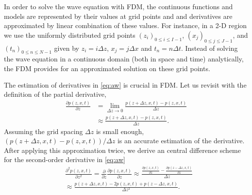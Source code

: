 \documentclass[11pt,titlepage]{article}
\theoremstyle{plain}
\theoremstyle{definition}
\theoremstyle{remark}
\numberwithin{equation}{section}
\begin{document}
In order to solve the wave equation with FDM, the continuous functions and models are represented by their values at grid points and and derivatives are approximated by linear combination of these values. For instance, in a 2-D region we use the uniformly distributed grid points $(z_i)_{0\le i \le I-1 }$, $(x_j)_{0\le j \le J-1}$, and $(t_n)_{0\le n \le N-1}$ given by $z_i = i\Delta z$, $x_j = j\Delta x$ and $t_n=n\Delta t$. Instead of solving the wave equation in a continuous domain (both in space and time) analytically, the FDM provides for an approximated solution on these grid points.  

The estimation of derivatives in \eqref{eq:aw} is crucial in FDM. Let us revisit with the definition of the partial derivative, 
 \begin{equation}
  \begin{aligned}
  \frac{\partial p(z, x, t)}{\partial z} &= \lim\limits_{\Delta z \rightarrow 0} \frac{p(z+\Delta z, x, t) - p(z, x, t)}{\Delta z}\\
  &\approx \frac{p(z+\Delta z, x, t) - p(z, x, t)}{\Delta z}.
  \end{aligned}
  \end{equation}
Assuming the grid spacing $\Delta z$ is small enough, $(p(z+\Delta z, x, t) - p(z, x, t))/\Delta z$ is an accurate estimation of the derivative. After applying this approximation twice, we derive an central difference scheme for the second-order derivative in \eqref{eq:aw}
  \begin{equation}
  \begin{aligned}
  &\frac{\partial^2 p(z, x, t)}{\partial z^2} = \frac{\partial}{\partial z}\frac{\partial p(z, x, t)}{\partial z} \approx \frac{\frac{\partial p(z, x, t)}{\partial z} - \frac{\partial p(z-\Delta z, x, t)}{\partial z}}{\Delta z}\\
  &\approx \frac{p(z+\Delta z, x, t) - 2p(z, x, t) + p(z-\Delta z, x, t)}{\Delta z^2}.
  \end{aligned}
  \end{equation}
  
\end{document}
